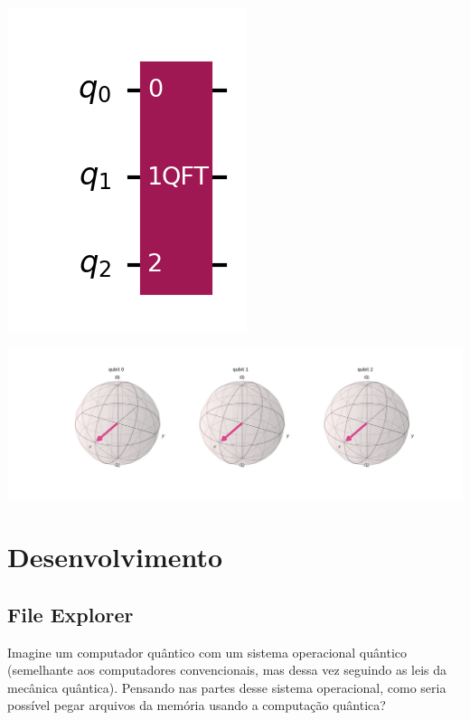 \documentclass{article}
\begin{document}
\begin{center}
	\includegraphics[scale=0.4]{QFT_1.png}
	\label{fig:QFT}
\end{center}

\begin{center}
	\includegraphics[scale=0.3]{QFT_1_bloch.png}
	\label{fig:QFT-bloch}
\end{center}


\section{Desenvolvimento}
\subsection{File Explorer} \label{file-explorer}

Imagine um computador quântico com um sistema operacional quântico (semelhante aos computadores convencionais, mas dessa vez seguindo as leis da mecânica quântica). Pensando nas partes desse sistema operacional, como seria possível pegar arquivos da memória usando a computação quântica?
\end{document}
